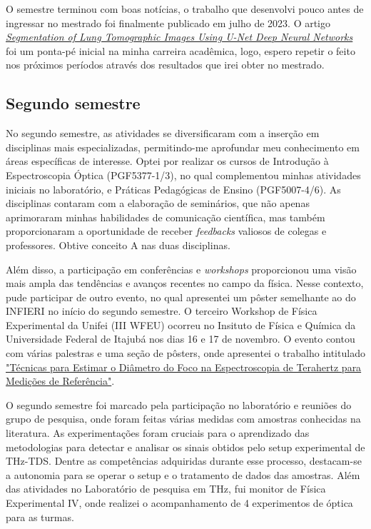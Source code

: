 \documentclass[a4paper,12pt,oneside]{article}
\begin{document}
O semestre terminou com boas notícias, o trabalho que desenvolvi pouco antes de ingressar no mestrado foi finalmente publicado em julho de 2023. O artigo \href{https://lajc.epn.edu.ec/index.php/LAJC/article/view/361}{\textit{Segmentation of Lung Tomographic Images Using U-Net Deep Neural Networks}} foi um ponta-pé inicial na minha carreira acadêmica, logo, espero repetir o feito nos próximos períodos através dos resultados que irei obter no mestrado.

\subsection{Segundo semestre}
\qquad No segundo semestre, as atividades se diversificaram com a inserção em disciplinas mais especializadas, permitindo-me aprofundar meu conhecimento em áreas específicas de interesse. Optei por realizar os cursos de Introdução à Espectroscopia Óptica (PGF5377-1/3), no qual complementou minhas atividades iniciais no laboratório, e Práticas Pedagógicas de Ensino (PGF5007-4/6). As disciplinas contaram com a elaboração de seminários, que não apenas aprimoraram minhas habilidades de comunicação científica, mas também proporcionaram a oportunidade de receber \textit{feedbacks} valiosos de colegas e professores. Obtive conceito A nas duas disciplinas.

Além disso, a participação em conferências e \textit{workshops} proporcionou uma visão mais ampla das tendências e avanços recentes no campo da física. Nesse contexto, pude participar de outro evento, no qual apresentei um pôster semelhante ao do INFIERI no início do segundo semestre. O terceiro Workshop de Física Experimental da Unifei (III WFEU)  ocorreu no Insituto de Física e Química da Universidade Federal de Itajubá nos dias 16 e 17 de novembro. O evento contou com várias palestras e uma seção de pôsters, onde apresentei o trabalho intitulado \href{https://sites.google.com/unifei.edu.br/iii-wfeu/resumos-posterspalestras/resumo-posters?authuser=0}{"Técnicas para Estimar o Diâmetro do Foco na Espectroscopia de Terahertz para Medições de Referência"}.

O segundo semestre foi marcado pela participação no laboratório e reuniões do grupo de pesquisa, onde foram feitas várias medidas com amostras conhecidas na literatura. As experimentações foram cruciais para o aprendizado das metodologias para detectar e analisar os sinais obtidos pelo setup experimental de THz-TDS. Dentre as competências adquiridas durante esse processo, destacam-se a autonomia para se operar o setup e o tratamento de dados das amostras. Além das atividades no Laboratório de pesquisa em THz, fui monitor de Física Experimental IV, onde realizei o acompanhamento de 4 experimentos de óptica para as turmas.
\end{document}
